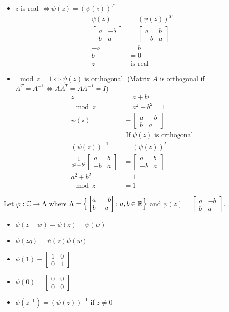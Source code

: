 \documentclass[12pt]{article}
\begin{document}
\begin{itemize}
 \item $z$ is real $\iff \psi(z) = (\psi(z))^T$ $$ \begin{aligned} \psi(z) &= (\psi(z))^T \\ \begin{bmatrix} a & -b \\ b & a \end{bmatrix} &= \begin{bmatrix} a & b \\ -b & a \end{bmatrix} \\ -b &= b \\ b &=0 \\ z  &\text{ is real} \end{aligned} $$ 
 \item $\mod{z} = 1 \iff \psi(z)$ is orthogonal. (Matrix $A$ is orthogonal if $A^T = A^{-1} \iff AA^T = AA^{-1} = I$) $$ \begin{aligned} z &= a + bi \\ \mod{z} &= a^2 + b^2 = 1 \\ \psi(z) &= \begin{bmatrix} a & -b \\ b & a \end{bmatrix} \\ &\text{ If } \psi(z) \text{ is orthogonal} \\ (\psi(z))^{-1} &= (\psi(z))^T \\ \frac{1}{a^2 + b^2} \begin{bmatrix} a & b \\ -b & a \end{bmatrix} &= \begin{bmatrix} a & b \\ -b & a \end{bmatrix} \\ a^2 + b^2 &= 1 \\ \mod{z} &= 1 \end{aligned} $$ \end{itemize} 
Let $\varphi: \mathbb{C} \to \Lambda$ where $\Lambda = \Big\{ \begin{bmatrix} a & -b \\ b & a \end{bmatrix} : a,b \in \mathbb{R}\Big\}$ and $\psi(z) = \begin{bmatrix} a & -b \\ b & a \end{bmatrix} $. \begin{itemize} 
\item $\psi(z + w) = \psi(z) + \psi(w)$ 
\item $\psi(zq) = \psi(z)\psi(w)$
\item $\psi(1) = \begin{bmatrix} 1 & 0 \\ 0 & 1 \end{bmatrix}$ 
\item $\psi(0) = \begin{bmatrix} 0 & 0 \\ 0 & 0 \end{bmatrix}$
\item $\psi(z^{-1}) = (\psi(z))^{-1}$ if $z \neq 0$ \end{itemize} 
\end{document}
